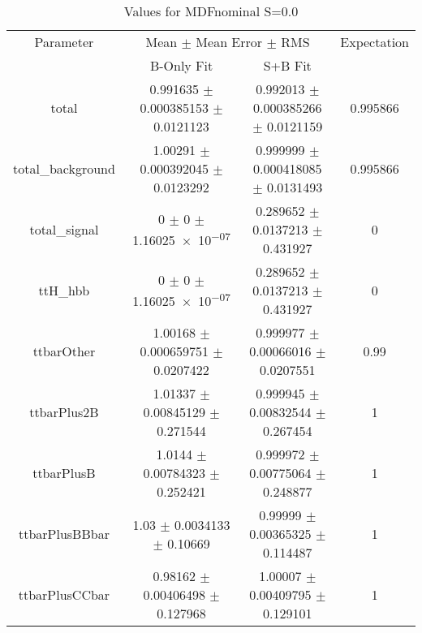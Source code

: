 \begin{table}
\centering
\caption{Values for MDFnominal S=0.0}
\begin{tabular}{cccc}
\toprule
Parameter & \multicolumn{2}{c}{Mean $\pm$ Mean Error $\pm$ RMS} & Expectation\\
 & B-Only Fit & S+B Fit & \\
\midrule
total & \num{0.991635} $\pm$ \num{0.000385153} $\pm$ \num{0.0121123} & \num{0.992013} $\pm$ \num{0.000385266} $\pm$ \num{0.0121159} & \num{0.995866}\\
total\_background & \num{1.00291} $\pm$ \num{0.000392045} $\pm$ \num{0.0123292} & \num{0.999999} $\pm$ \num{0.000418085} $\pm$ \num{0.0131493} & \num{0.995866}\\
total\_signal & \num{0} $\pm$ \num{0} $\pm$ \num{1.16025e-07} & \num{0.289652} $\pm$ \num{0.0137213} $\pm$ \num{0.431927} & \num{0}\\
ttH\_hbb & \num{0} $\pm$ \num{0} $\pm$ \num{1.16025e-07} & \num{0.289652} $\pm$ \num{0.0137213} $\pm$ \num{0.431927} & \num{0}\\
ttbarOther & \num{1.00168} $\pm$ \num{0.000659751} $\pm$ \num{0.0207422} & \num{0.999977} $\pm$ \num{0.00066016} $\pm$ \num{0.0207551} & \num{0.99}\\
ttbarPlus2B & \num{1.01337} $\pm$ \num{0.00845129} $\pm$ \num{0.271544} & \num{0.999945} $\pm$ \num{0.00832544} $\pm$ \num{0.267454} & \num{1}\\
ttbarPlusB & \num{1.0144} $\pm$ \num{0.00784323} $\pm$ \num{0.252421} & \num{0.999972} $\pm$ \num{0.00775064} $\pm$ \num{0.248877} & \num{1}\\
ttbarPlusBBbar & \num{1.03} $\pm$ \num{0.0034133} $\pm$ \num{0.10669} & \num{0.99999} $\pm$ \num{0.00365325} $\pm$ \num{0.114487} & \num{1}\\
ttbarPlusCCbar & \num{0.98162} $\pm$ \num{0.00406498} $\pm$ \num{0.127968} & \num{1.00007} $\pm$ \num{0.00409795} $\pm$ \num{0.129101} & \num{1}\\
\bottomrule
\end{tabular}
\end{table}